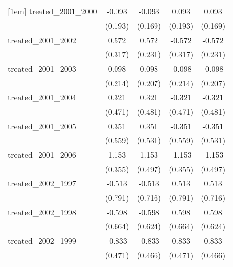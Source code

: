 {\begin{tabular}{l*{4}{c}}
[1em]
treated\_2001\_2000&      -0.093         &      -0.093         &       0.093         &       0.093         \\
            &     (0.193)         &     (0.169)         &     (0.193)         &     (0.169)         \\
[1em]
treated\_2001\_2002&       0.572         &       0.572\sym{*}  &      -0.572         &      -0.572\sym{*}  \\
            &     (0.317)         &     (0.231)         &     (0.317)         &     (0.231)         \\
[1em]
treated\_2001\_2003&       0.098         &       0.098         &      -0.098         &      -0.098         \\
            &     (0.214)         &     (0.207)         &     (0.214)         &     (0.207)         \\
[1em]
treated\_2001\_2004&       0.321         &       0.321         &      -0.321         &      -0.321         \\
            &     (0.471)         &     (0.481)         &     (0.471)         &     (0.481)         \\
[1em]
treated\_2001\_2005&       0.351         &       0.351         &      -0.351         &      -0.351         \\
            &     (0.559)         &     (0.531)         &     (0.559)         &     (0.531)         \\
[1em]
treated\_2001\_2006&       1.153\sym{**} &       1.153\sym{*}  &      -1.153\sym{**} &      -1.153\sym{*}  \\
            &     (0.355)         &     (0.497)         &     (0.355)         &     (0.497)         \\
[1em]
treated\_2002\_1997&      -0.513         &      -0.513         &       0.513         &       0.513         \\
            &     (0.791)         &     (0.716)         &     (0.791)         &     (0.716)         \\
[1em]
treated\_2002\_1998&      -0.598         &      -0.598         &       0.598         &       0.598         \\
            &     (0.664)         &     (0.624)         &     (0.664)         &     (0.624)         \\
[1em]
treated\_2002\_1999&      -0.833         &      -0.833         &       0.833         &       0.833         \\
            &     (0.471)         &     (0.466)         &     (0.471)         &     (0.466)         \\

\end{tabular}}
